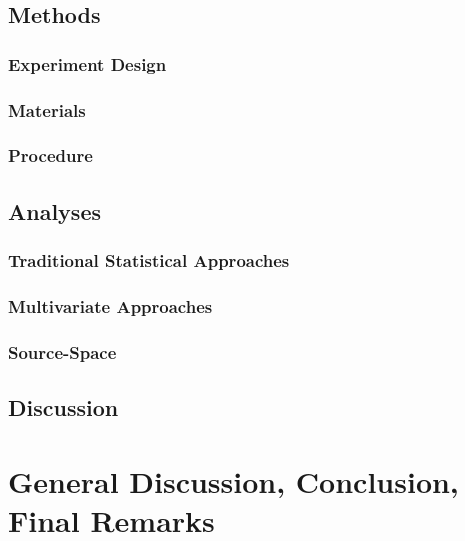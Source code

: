 \documentclass[english]{article}
\begin{document}
\subsection{Methods}
\subsubsection{Experiment Design}
\subsubsection{Materials}
\subsubsection{Procedure}

\subsection{Analyses}
\subsubsection{Traditional Statistical Approaches}
\subsubsection{Multivariate Approaches}
\subsubsection{Source-Space}

\subsection{Discussion}

\section{General Discussion, Conclusion, Final Remarks}
\end{document}
